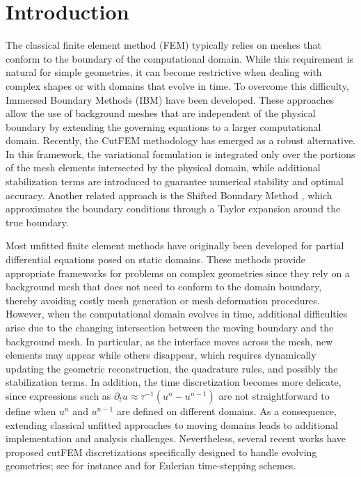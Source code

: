 \documentclass[11pt,a4paper]{article}
\theoremstyle{plain}
\theoremstyle{definition}
\theoremstyle{remark}
\numberwithin{equation}{section}
\begin{document}
\section{Introduction}

The classical finite element method (FEM) typically relies on meshes that conform to the boundary of the computational domain. While this requirement is natural for simple geometries, it can become restrictive when dealing with complex shapes or with domains that evolve in time.
To overcome this difficulty, Immersed Boundary Methods (IBM) \cite{IBMrev} have been developed. These approaches allow the use of background meshes that are independent of the physical boundary by extending the governing equations to a larger computational domain.
Recently, the CutFEM methodology \cite{cutfem, cutfem_mixed} has emerged as a robust alternative. In this framework, the variational formulation is integrated only over the portions of the mesh elements intersected by the physical domain, while additional stabilization terms are introduced to guarantee numerical stability and optimal accuracy.
Another related approach is the Shifted Boundary Method \cite{sbm}, which approximates the boundary conditions through a Taylor expansion around the true boundary.

Most unfitted finite element methods have originally been developed for partial differential equations posed on static domains. These methods provide appropriate frameworks for problems on complex geometries since they rely on a background mesh that does not need to conform to the domain boundary, thereby avoiding costly mesh generation or mesh deformation procedures. However, when the computational domain evolves in time, additional difficulties arise due to the changing intersection between the moving boundary and the background mesh. In particular, as the interface moves across the mesh, new elements may appear while others disappear, which requires dynamically updating the geometric reconstruction, the quadrature rules, and possibly the stabilization terms. In addition, the time discretization becomes more delicate, since expressions such as $\partial_t u \approx \tau^{-1}(u^n-u^{n-1})$ are not straightforward to define when $u^n$ and $u^{n-1}$ are defined on different domains.
As a consequence, extending classical unfitted approaches to moving domains leads to additional implementation and analysis challenges. Nevertheless, several recent works have proposed cutFEM discretizations specifically designed to handle evolving geometries; see for instance \cite{heimann2025discretization,heimann2023geometrically,preuss2018higher}
 and \cite{burman2022eulerian,wahl-richter-lehrenfeld2022unfitted} for Eulerian time-stepping schemes.
\end{document}
